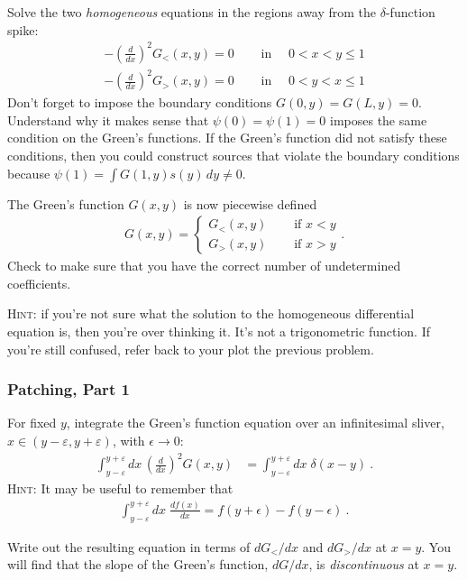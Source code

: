 \documentclass[12pt]{article}
\numberwithin{equation}{subsection}    %
\begin{document}
Solve the two \emph{homogeneous} equations in the regions away from the $\delta$-function spike:
\begin{align}
 	-\left(\frac{d}{dx}\right)^2 G_{<}(x,y) = 0  
 	& \quad\text{ in }\quad 0 < x < y \leq 1 
 	\\
 	-\left(\frac{d}{dx}\right)^2 G_{>}(x,y) = 0  
 	& \quad\text{ in }\quad 0 < y < x \leq 1
\end{align}
Don't forget to impose the boundary conditions $G(0, y) = G(L,y) = 0$. Understand why it makes sense that $\psi(0) = \psi(1) = 0$ imposes the same condition on the Green's functions. If the Green's function did not satisfy these conditions, then you could construct sources that violate the boundary conditions because $\psi(1) = \int G(1,y) s(y)\, dy \neq 0$.

The Green's function $G(x,y)$ is now piecewise defined
\begin{align}G(x,y) = \left\{ 
\begin{array}{ll}
 	G_<(x,y) & \quad\text{ if } x<y\\
 	G_>(x,y) & \quad\text{ if } x>y
 \end{array}\right. .
 \label{eq:piecewise:def}
 \end{align}
Check to make sure that you have the correct number of undetermined coefficients. 

\textsc{Hint}: if you're not sure what the solution to the homogeneous differential equation is, then you're over thinking it. It's not a trigonometric function. If you're still confused, refer back to your plot the previous problem.

\subsubsection{Patching, Part 1}
For fixed $y$, integrate the Green's function equation over an infinitesimal sliver, $x \in (y-\varepsilon, y + \varepsilon)$, with $\epsilon \to 0$: 
\begin{align}
	\int_{y-\varepsilon}^{y+\varepsilon} dx\, \left(\frac{d}{dx}\right)^2 G(x,y) &=  
	\int_{y-\varepsilon}^{y+\varepsilon} dx\; \delta(x-y)
	\ .
	\label{eq:patching:1}
\end{align}
\textsc{Hint}: It may be useful to remember that
\begin{align}
	\int_{y-\varepsilon}^{y+\varepsilon} dx\; \frac{df(x)}{dx} = f(y+\epsilon) - f(y-\epsilon) \ .
\end{align}

Write out the resulting equation in terms of $dG_</dx$ and $dG_>/dx$ at $x=y$. You will find that the slope of the Green's function, $dG/dx$, is \emph{discontinuous} at $x=y$. 
\end{document}
